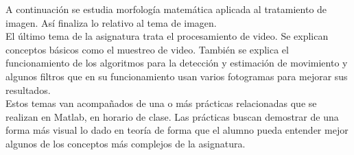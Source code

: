 A continuación se estudia morfología matemática aplicada al tratamiento de imagen. Así finaliza lo relativo al tema de imagen.\\

El último tema de la asignatura trata el procesamiento de video. Se explican conceptos básicos como el muestreo de video. También se explica el funcionamiento de los algoritmos para la detección y estimación de movimiento y algunos filtros que en su funcionamiento usan varios fotogramas para mejorar sus resultados.\\

Estos temas van acompañados de una o más prácticas relacionadas que se realizan en Matlab, en horario de clase. Las prácticas buscan demostrar de una forma más visual lo dado en teoría de forma que el alumno pueda entender mejor algunos de los conceptos más complejos de la asignatura.\\

